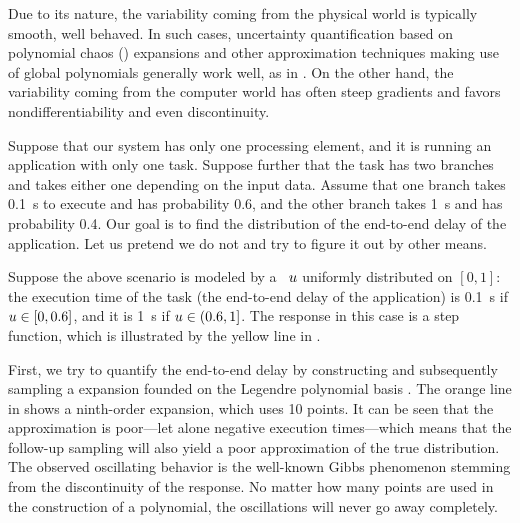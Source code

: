 
Due to its nature, the variability coming from the physical world is typically
smooth, well behaved. In such cases, uncertainty quantification based on
polynomial chaos () expansions \cite{xiu2010} and other approximation
techniques making use of global polynomials generally work well, as in
\cite{bhardwaj2008, lee2013, ukhov2014, ukhov2015}. On the other hand, the
variability coming from the computer world has often steep gradients and favors
nondifferentiability and even discontinuity. 

Suppose that our system has only one processing element, and it is running an
application with only one task. Suppose further that the task has two branches
and takes either one depending on the input data. Assume that one branch takes
0.1~s to execute and has probability 0.6, and the other branch takes 1~s and has
probability 0.4. Our goal is to find the distribution of the end-to-end delay of
the application.  Let us pretend we do not and try to figure it out by other means.

Suppose the above scenario is modeled by a \rv\ $u$ uniformly distributed on
$[0, 1]$: the execution time of the task (the end-to-end delay of the
application) is 0.1~s if $u \in [0, 0.6]$, and it is 1~s if $u \in (0.6, 1]$.
The response in this case is a step function, which is illustrated by the yellow
line in .

First, we try to quantify the end-to-end delay by constructing and subsequently
sampling a  expansion founded on the Legendre polynomial basis
\cite{xiu2010}. The orange line in  shows a ninth-order 
expansion, which uses 10 points. It can be seen that the approximation is
poor---let alone negative execution times---which means that the follow-up
sampling will also yield a poor approximation of the true distribution. The
observed oscillating behavior is the well-known Gibbs phenomenon stemming from
the discontinuity of the response. No matter how many points are used in the
construction of a polynomial, the oscillations will never go away completely.


